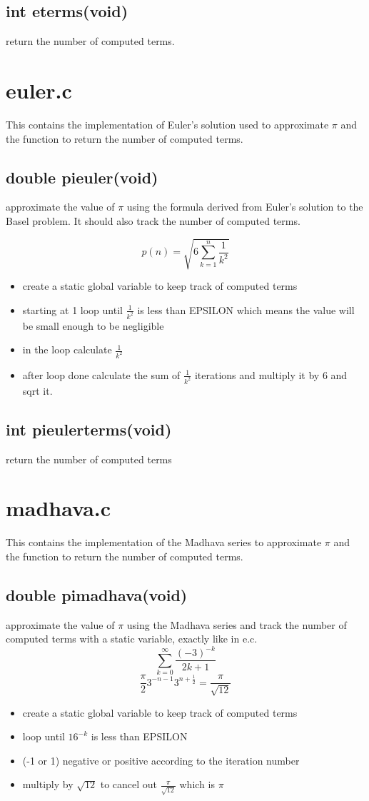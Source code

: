\documentclass{article}
\begin{document}
\subsection{int e\textunderscore terms(void)}
return the number of computed terms.
\section{euler.c}
This contains the implementation of Euler’s solution used to approximate $\pi$ and the function to return the number of computed terms.
\subsection{double pi\textunderscore euler(void)}
approximate the value of $\pi$ using the formula derived from Euler’s solution to the Basel problem. It should also track the number of computed terms.

\[ p(n) = \sqrt{6 \sum_{k=1}^{n} \frac{1}{k^2}} \]
\begin{itemize}
   \item create a static global variable to keep track of computed terms
   \item starting at 1 loop until $\frac{1}{k^2}$ is less than EPSILON which means the value will be small enough to be negligible
   \item in the loop calculate $\frac{1}{k^2}$
   \item after loop done calculate the sum of $\frac{1}{k^2}$ iterations and multiply it by 6 and sqrt it. 
\end{itemize}
\subsection{int pi\textunderscore euler\textunderscore terms(void)}
return the number of computed terms
\section{madhava.c}
This contains the implementation of the Madhava series to approximate $\pi$ and the function to return the number of computed terms.
\subsection{double pi\textunderscore madhava(void)}
approximate the value of $\pi$ using the Madhava series and track the number of computed terms with a static variable, exactly like in e.c.
\[ \sum\limits_{k=0}^{\infty} \frac{(-3)^{-k}}{2k+1}\]
\[\frac{\pi}{2} 3^{-n-1} 3^{n+\frac{1}{2}} = \frac{\pi}{\sqrt{12}}\]
\begin{itemize}
    \item create a static global variable to keep track of computed terms
    \item loop until $16^{-k}$ is less than EPSILON
    \item (-1 or 1) negative or positive according to the iteration number
    \item multiply by $\sqrt{12}$ to cancel out $\frac{\pi}{\sqrt{12}}$ which is $\pi$
\end{itemize}
\end{document}
